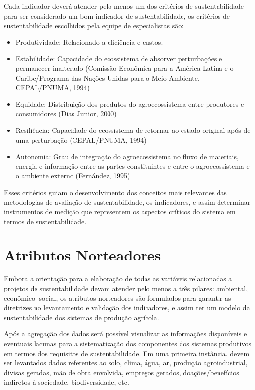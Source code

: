 Cada indicador deverá atender pelo menos um dos critérios de sustentabilidade
para ser considerado um bom indicador de sustentabilidade, os critérios
de sustentabilidade escolhidos pela equipe de especialistas são\citet{moura2002indicadores}:
\begin{itemize}
\item Produtividade: Relacionado a eficiência e custos.
\item Estabilidade: Capacidade do ecossistema de absorver perturbações e
permanecer inalterado (Comissão Econômica para a América Latina e
o Caribe/Programa das Nações Unidas para o Meio Ambiente, CEPAL/PNUMA,
1994) 
\item Equidade: Distribuição dos produtos do agroecossistema entre produtores
e consumidores (Dias Junior, 2000) 
\item Resiliência: Capacidade do ecossistema de retornar ao estado original
após de uma perturbação (CEPAL/PNUMA, 1994) 
\item Autonomia: Grau de integração do agroecossistema no fluxo de materiais,
energia e informação entre as partes constituintes e entre o agroecossistema
e o ambiente externo (Fernández, 1995)
\end{itemize}
Esses critérios guiam o desenvolvimento dos conceitos mais relevantes
das metodologias de avaliação de sustentabilidade, os indicadores,
e assim determinar instrumentos de medição que representem os aspectos
críticos do sistema em termos de sustentabilidade.

\section{Atributos Norteadores}

Embora a orientação para a elaboração de todas as variáveis relacionadas
a projetos de sustentabilidade devam atender pelo menos a três pilares:
ambiental, econômico, social, os atributos norteadores são formulados
para garantir as diretrizes no levantamento e validação dos indicadores,
e assim ter um modelo da sustentabilidade dos sistemas de produção
agrícola.

Após a agregação dos dados será possível visualizar as informações
disponíveis e eventuais lacunas para a sistematização dos componentes
dos sistemas produtivos em termos dos requisitos de sustentabilidade.
Em uma primeira instância, devem ser levantados dados referentes ao
solo, clima, água, ar, produção agroindustrial, divisas geradas, mão
de obra envolvida, empregos gerados, doações/benefícios indiretos
à sociedade, biodiversidade, etc.

